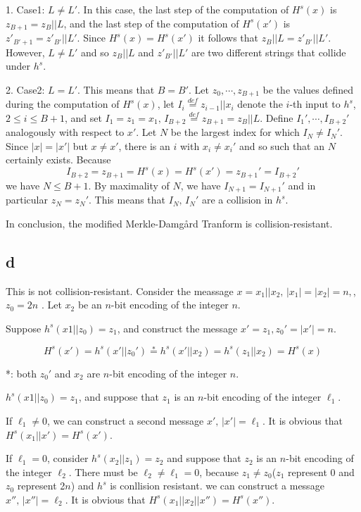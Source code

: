 \documentclass[a4papers]{ctexart}
\begin{document}
1. Case1: $L\ne L'$. In this case, the last step of the computation of $H^s(x)$ is $z_{B+1}=z_{B}||L$, and
the last step of the computation of $H^s(x')$ is $z'_{B'+1}=z'_{B'}||L'$. Since $H^s(x)=H^s(x')$ it follows that 
$z_{B}||L = z'_{B'}||L'$. However, $L \ne L'$ and so $z_{B}||L$ and $z'_{B'}||L'$ are two different strings that collide under $h^s$.

2. Case2: $L=L'$. This means that $B=B'$. Let $z_0,\cdots,z_{B+1}$ be the values defined during
the computation of $H^s(x)$, let $I_i \overset{def}{=} z_{i-1}||x_i$ denote the $i$-th input to $h^s$, $2\le i\le B+1$,
 and set $I_1 = z_1 = x_1,\, I_{B+2}\overset{def}{=}z_{B+1}=z_B||L$. Define $I_1',\cdots,I_{B+2}'$ analogously with respect to $x'$.
 Let $N$ be the largest index for which $I_N\ne I_{N}'$. Since $|x|=|x'|$ but $x\ne x'$, there is an $i$ with $x_i\ne x_i'$
 and so such that an $N$ certainly exists. Because
 \[ I_{B+2}=z_{B+1}=H^s(x)=H^s(x')=z_{B+1}'=I_{B+2}' \]
 we have $N\le B+1$. By maximality of $N$, we have $I_{N+1}=I_{N+1}'$ and in particular $z_{N}=z_{N}'$. 
 This means that $I_N,\, I_N'$ are a collision in $h^s$.

 In conclusion, the modified Merkle-Damgård Tranform is collision-resistant.


\subsection*{d}
This is not collision-resistant.
Consider the meassage $x = x_1||x_2,\, |x_1|=|x_2|=n,$,$z_0=2n$ .
Let $x_2$ be an $n$-bit encoding of the integer $n$.

Suppose $h^s(x1||z_0)=z_1$, and construct the message $x' = z_1, z_0'=|x'|=n$.

\[ H^s(x')=h^s(x'||z_0')\overset{*}{=}h^s(x'||x_2)=h^s(z_1||x_2)=H^s(x)\]

*: both $z_0'$ and $x_2$ are $n$-bit encoding of the integer $n$.


 $h^s(x1||z_0)=z_1$, and suppose that $z_1$ is an $n$-bit encoding of the integer $\ell_1$.

 If $\ell_1\ne 0 $, we can construct a second message $x',\,|x'|=\ell_1$. It is obvious that $H^s(x_1||x')=H^s(x')$.
 
 If $\ell_1 = 0$, consider $h^s(x_2||z_1)=z_2$ and suppose that $z_2$ is an $n$-bit encoding of the integer $\ell_2$.
 There must be $\ell_2\ne \ell_1 = 0$, because $z_1 \ne z_0$($z_1$ represent $0$ and $z_0$ represent 2$n$) and $h^s$ is 
 conllision resistant.
 we can construct a message $x'',\,|x''|=\ell_2$. It is obvious that $H^s(x_1||x_2||x'')=H^s(x'')$.
\end{document}
